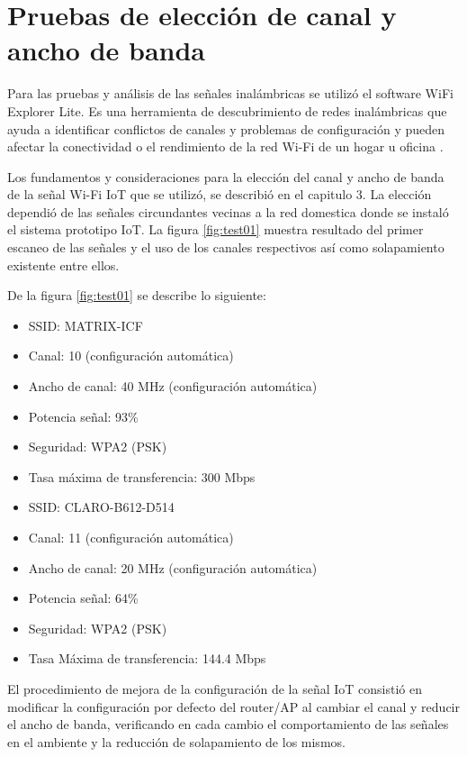 \section{Pruebas de elección de canal y ancho de banda}
Para las pruebas y análisis de las señales inalámbricas se utilizó el software WiFi Explorer Lite. Es una herramienta de descubrimiento de redes inalámbricas que ayuda a identificar conflictos de canales y problemas de configuración y  pueden afectar la conectividad o el rendimiento de la red Wi-Fi de un hogar u oficina \citep{WEBSITE:24}. 

Los fundamentos y consideraciones para la elección del canal y ancho de banda de la señal Wi-Fi IoT que se utilizó, se describió en el capitulo 3. La elección dependió de las señales circundantes vecinas a la red domestica donde se instaló el sistema prototipo IoT. La figura \ref{fig:test01} muestra resultado del primer escaneo de las señales y el uso de los canales respectivos así como solapamiento existente entre ellos. 

De la figura \ref{fig:test01} se describe lo siguiente:

\begin{itemize}
\item SSID: MATRIX-ICF
\item Canal: 10 (configuración automática)
\item Ancho de canal: 40 MHz (configuración automática)
\item Potencia señal: 93\%
\item Seguridad:  WPA2 (PSK)
\item Tasa máxima de transferencia: 300 Mbps
\end{itemize}


\begin{itemize} 
\item SSID: CLARO-B612-D514
\item Canal: 11 (configuración automática)
\item Ancho de canal: 20 MHz (configuración automática)
\item Potencia señal: 64\%
\item Seguridad: WPA2 (PSK)
\item Tasa Máxima de transferencia: 144.4 Mbps
\end{itemize}

El procedimiento de mejora de la configuración de la señal IoT consistió en modificar la configuración por defecto del router/AP al cambiar el canal y reducir el ancho de banda, verificando en cada cambio el comportamiento de las señales en el ambiente y la reducción de solapamiento de los mismos.

